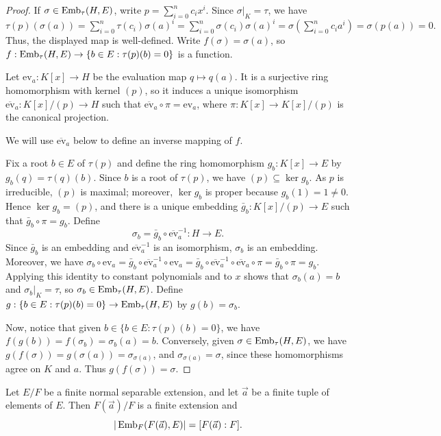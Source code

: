 \begin{proof}
If $\sigma\in\operatorname{Emb}_{\tau}(H,E)$, write
$p=\sum_{i=0}^n c_i x^i$. Since $\sigma|_K=\tau$, we have
$
\tau(p)(\sigma(a))
=\sum_{i=0}^n\tau(c_i)\sigma(a)^i
=\sum_{i=0}^n\sigma(c_i)\sigma(a)^i
=\sigma\left(\sum_{i=0}^n c_i a^i\right)
=\sigma(p(a))=0.
$
Thus, the displayed map is well-defined.
Write $f(\sigma)=\sigma(a)$, so $f:\operatorname{Emb}_{\tau}(H,E)\to\{b\in E:\tau(p)(b)=0\}$ is a function.

Let $\mathrm{ev}_a:K[x]\to H$ be the evaluation map $q\mapsto q(a)$.
It is a surjective ring homomorphism with kernel $(p)$, so it induces
a unique isomorphism
$\overline{\mathrm{ev}}_a:K[x]/(p)\to H$ such that
$\overline{\mathrm{ev}}_a\circ\pi=\mathrm{ev}_a$, where
$\pi:K[x]\to K[x]/(p)$ is the canonical projection.

We will use $\overline{\mathrm{ev}}_a$ below to define an inverse mapping of $f$.

Fix a root $b\in E$ of $\tau(p)$ and define the ring homomorphism
$g_b:K[x]\to E$ by $g_b(q)=\tau(q)(b)$.
Since $b$ is a root of $\tau(p)$, we have $(p)\subseteq\ker g_b$.
As $p$ is irreducible, $(p)$ is maximal; moreover, $\ker g_b$ is
proper because $g_b(1)=1\neq 0$. Hence $\ker g_b=(p)$, and there is
a unique embedding $\bar g_b:K[x]/(p)\to E$ such that
$\bar g_b\circ\pi=g_b$. Define
\[
 \sigma_b=\bar g_b\circ\overline{\mathrm{ev}}_a^{-1}:H\to E.
\]
Since $\bar g_b$ is an embedding and $\overline{\mathrm{ev}}_a^{-1}$ is
an isomorphism, $\sigma_b$ is an embedding. Moreover, we have
$\sigma_b\circ\mathrm{ev}_a=\bar g_b\circ\overline{\mathrm{ev}}_a^{-1}
\circ\mathrm{ev}_a=\bar g_b\circ\overline{\mathrm{ev}}_a^{-1}
\circ\overline{\mathrm{ev}}_a\circ\pi=\bar g_b\circ\pi=g_b$.
Applying this identity to constant polynomials and to $x$ shows that
$\sigma_b(a)=b$ and $\sigma_b|_K=\tau$, so $\sigma_b\in\operatorname{Emb}_{\tau}(H,E)$.
Define $g:\{b\in E:\tau(p)(b)=0\}\to\operatorname{Emb}_{\tau}(H,E)$ by $g(b)=\sigma_b$.

Now, notice that given $b \in \{b\in E:\tau(p)(b)=0\}$, we have $f(g(b))=f(\sigma_b)=\sigma_b(a)=b$.
Conversely, given $\sigma \in \operatorname{Emb}_{\tau}(H,E)$, we have
$g(f(\sigma))=g(\sigma(a))=\sigma_{\sigma(a)}$,
and $\sigma_{\sigma(a)}=\sigma$, since these homomorphisms agree on $K$ and $a$.
Thus $g(f(\sigma))=\sigma$.
\end{proof}

\begin{lemma}\label{lem:count-embeddings}
Let $E/F$ be a finite normal separable extension, and let $\vec a$
be a finite tuple of elements of $E$.
Then $F(\vec a)/F$ is a finite extension and
\[
 |\operatorname{Emb}_F(F(\vec a),E)|=[F(\vec a):F].
\]
\end{lemma}

